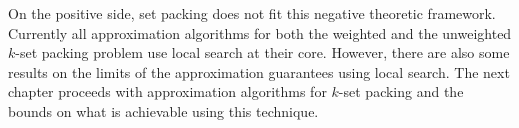 On the positive side, set packing does not fit this negative theoretic framework. Currently all approximation algorithms for both the weighted and the unweighted $k$-set packing problem use local search at their core. %
However, there are also some results on the limits of the approximation guarantees using local search.
The next chapter proceeds with approximation algorithms for $k$-set packing %
and the bounds on what is achievable using this technique. %